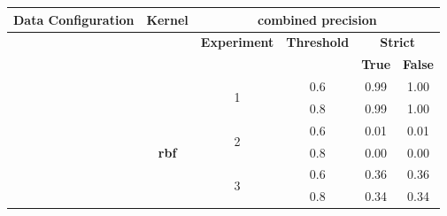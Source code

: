 \documentclass{mpaper}
\begin{document}
\begin{table}[]
\centering
\begin{tabular}{|c|c|cccc|}
\hline
\textbf{Data Configuration}     & \textbf{Kernel}       & \multicolumn{4}{c|}{\textbf{combined precision}}                                                                                                                                    \\ \hline
\textbf{}                       & \multicolumn{1}{l|}{} & \multicolumn{1}{c|}{\textbf{Experiment}}                        & \multicolumn{1}{c|}{\textbf{Threshold}} & \multicolumn{2}{c|}{\textbf{Strict}}                                    \\ \cline{3-6} 
\multicolumn{1}{|l|}{\textbf{}} & \textbf{}             & \multicolumn{1}{l|}{\textbf{}}                                  & \multicolumn{1}{l|}{\textbf{}}          & \multicolumn{1}{l}{\textbf{True}} & \multicolumn{1}{l|}{\textbf{False}} \\ \cline{3-6} 
\textbf{}                       & \textbf{}             & \multicolumn{1}{c|}{\multirow{2}{*}{1}}                         & \multicolumn{1}{c|}{0.6}                & 0.99                              & 1.00                                \\
\textbf{}                       & \textbf{}             & \multicolumn{1}{c|}{}                                           & \multicolumn{1}{c|}{0.8}                & 0.99                              & 1.00                                \\ \cline{3-6} 
\textbf{}                       & \textbf{}             & \multicolumn{1}{c|}{\multirow{2}{*}{2}}                         & \multicolumn{1}{c|}{0.6}                & 0.01                              & 0.01                                \\
\textbf{}                       & \textbf{rbf}          & \multicolumn{1}{c|}{}                                           & \multicolumn{1}{c|}{0.8}                & 0.00                              & 0.00                                \\ \cline{3-6} 
\textbf{}                       & \textbf{}             & \multicolumn{1}{c|}{\multirow{2}{*}{3}}                         & \multicolumn{1}{c|}{0.6}                & 0.36                              & 0.36                                \\
\textbf{}                       & \textbf{}             & \multicolumn{1}{c|}{}                                           & \multicolumn{1}{c|}{0.8}                & 0.34                              & 0.34                                \\ \cline{3-6} 

\end{tabular}
\end{table}
\end{document}
